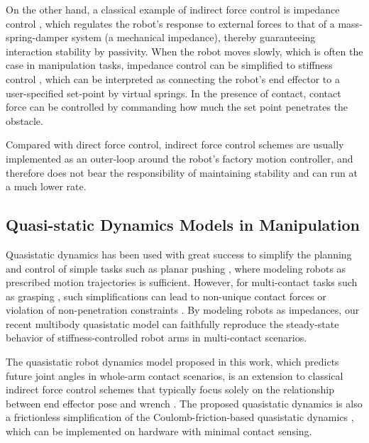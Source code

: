 On the other hand, a classical example of indirect force control is impedance control \cite{hogan1984impedance}, which regulates the robot's response to external forces to that of a mass-spring-damper system (a mechanical impedance), thereby guaranteeing interaction stability by passivity. When the robot moves slowly, which is often the case in manipulation tasks, impedance control can be simplified to stiffness control \cite{salisbury1980active}, which can be interpreted as connecting the robot's end effector to a user-specified set-point by virtual springs. In the presence of contact, contact force can be controlled by commanding how much the set point penetrates the obstacle.

Compared with direct force control, indirect force control schemes are usually implemented as an outer-loop around the robot's factory motion controller, and therefore does not bear the responsibility of maintaining stability and can run at a much lower rate.

\subsection{Quasi-static Dynamics Models in Manipulation}
Quasistatic dynamics has been used with great success to simplify the planning and control of simple tasks such as planar pushing \cite{hogan2020feedback}, where modeling robots as prescribed motion trajectories is sufficient. However, for multi-contact tasks such as grasping \cite{pang1996complementarity}, such simplifications can lead to non-unique contact forces  or violation of non-penetration constraints \cite{halm2018quasi, pang2018robust}. By modeling robots as impedances, our recent multibody quasistatic model \cite{pang2021convex} can faithfully reproduce the steady-state behavior of stiffness-controlled robot arms in multi-contact scenarios.

The quasistatic robot dynamics model proposed in this work, which predicts future joint angles in whole-arm contact scenarios, is an extension to classical indirect force control schemes that typically focus solely on the relationship between end effector pose and wrench \cite{salisbury1980active, hogan1984impedance}. The proposed quasistatic dynamics is also a frictionless simplification of the Coulomb-friction-based quasistatic dynamics \cite{pang2021convex}, which can be implemented on hardware with minimal contact sensing.


